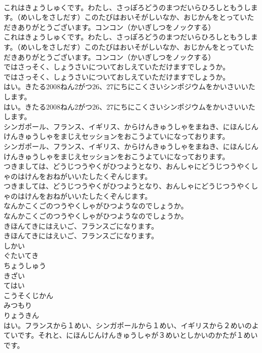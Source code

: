 \documentclass[8pt]{extreport}
\begin{document}
\begin{CJK}{UTF8}{min}
\\	これはきょうしゅくです。わたし、さっぽろどうのまつだいらひろしともうします。（めいしをさしだす）このたびはおいそがしいなか、おじかんをとっていただきありがとうございます。コンコン（かいぎしつをノックする）	
\\	これはきょうしゅくです。わたし、さっぽろどうのまつだいらひろしともうします。（めいしをさしだす）このたびはおいそがしいなか、おじかんをとっていただきありがとうございます。コンコン（かいぎしつをノックする） 
\\	ではさっそく、しょうさいについておしえていただけますでしょうか。	
\\	ではさっそく、しょうさいについておしえていただけますでしょうか。 
\\	はい。きたる2008ねん2がつ26、27にちにこくさいシンポジウムをかいさいいたします。	
\\	はい。きたる2008ねん2がつ26、27にちにこくさいシンポジウムをかいさいいたします。 
\\	シンガポール、フランス、イギリス、からけんきゅうしゃをまねき、にほんじんけんきゅうしゃをまじえセッションをおこうよていになっております。	
\\	シンガポール、フランス、イギリス、からけんきゅうしゃをまねき、にほんじんけんきゅうしゃをまじえセッションをおこうよていになっております。 
\\	つきましては、どうじつうやくがひつようとなり、おんしゃにどうじつうやくしゃのはけんをおねがいいたしたくぞんじます。	
\\	つきましては、どうじつうやくがひつようとなり、おんしゃにどうじつうやくしゃのはけんをおねがいいたしたくぞんじます。 
\\	なんかこくごのつうやくしゃがひつようなのでしょうか。	
\\	なんかこくごのつうやくしゃがひつようなのでしょうか。 
\\	きほんてきにはえいご、フランスごになります。	
\\	きほんてきにはえいご、フランスごになります。 
\\	しかい
\\	ぐたいてき
\\	ちょうしゅう
\\	きざい
\\	てはい
\\	こうそくじかん
\\	みつもり
\\	りょうきん
\\	はい。フランスから１めい、シンガポールから１めい、イギリスから２めいのよていです。それと、にほんじんけんきゅうしゃが３めいとしかいのかたが１めいです。	

\end{CJK}
\end{document}
